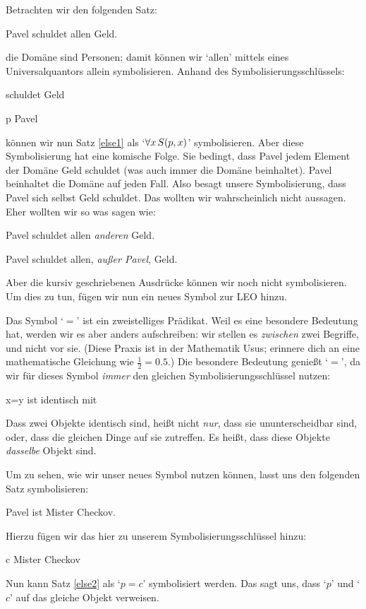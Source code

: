 Betrachten wir den folgenden Satz:
\begin{earg}
\item[\ex{else1}] Pavel schuldet allen Geld.
\end{earg}
die Domäne sind Personen; damit können wir `allen' mittels eines Universalquantors allein symbolisieren. Anhand des Symbolisierungsschlüssels:
	\begin{ekey}
		\item[\atom{S}{x,y}]  schuldet  Geld
		\item[p] Pavel
	\end{ekey}
können wir nun Satz \ref{else1} als `$\forall x\, \mathord{S}(p,x)$' symbolisieren. Aber diese Symbolisierung hat eine komische Folge. Sie bedingt, dass Pavel jedem Element der Domäne Geld schuldet (was auch immer die Domäne beinhaltet). Pavel beinhaltet die Domäne auf jeden Fall. Also besagt unsere Symbolisierung, dass Pavel sich selbst Geld schuldet. Das wollten wir wahrscheinlich nicht aussagen. Eher wollten wir so was sagen wie:
	\begin{earg}
		\item[\ex{else1b}] Pavel schuldet allen \emph{anderen} Geld.
		\item[\ex{else1c}] Pavel schuldet allen, \emph{au{\ss}er Pavel}, Geld.
	\end{earg}
Aber die kursiv geschriebenen Ausdrücke können wir noch nicht symbolisieren. Um dies zu tun, fügen wir nun ein neues Symbol zur LEO hinzu.

Das Symbol `$=$' ist ein zweistelliges Prädikat. Weil es eine besondere Bedeutung hat, werden wir es aber anders aufschreiben: wir stellen es \emph{zwischen} zwei Begriffe, und nicht vor sie. (Diese Praxis ist in der Mathematik Usus; erinnere dich an eine mathematische Gleichung wie $\frac{1}{2} = 0.5$.) Die besondere Bedeutung genie{\ss}t `$=$', da wir für dieses Symbol \emph{immer} den gleichen Symbolisierungsschlüssel nutzen: 
	\begin{ekey}
		\item[x=y]  ist identisch mit \gap{y}
	\end{ekey}
Dass zwei Objekte identisch sind, hei{\ss}t nicht \emph{nur}, dass sie ununterscheidbar sind, oder, dass die gleichen Dinge auf sie zutreffen. Es hei{\ss}t, dass diese Objekte \emph{dasselbe} Objekt sind.

Um zu sehen, wie wir unser neues Symbol nutzen können, lasst uns den folgenden Satz symbolisieren:
\begin{earg}
\item[\ex{else2}] Pavel ist Mister Checkov.
\end{earg}
Hierzu fügen wir das hier zu unserem Symbolisierungsschlüssel hinzu:
	\begin{ekey}
		\item[c] Mister Checkov
	\end{ekey}
Nun kann Satz \ref{else2} als `$p=c$' symbolisiert werden. Das sagt uns, dass `$p$' und `$c$' auf das gleiche Objekt verweisen.

